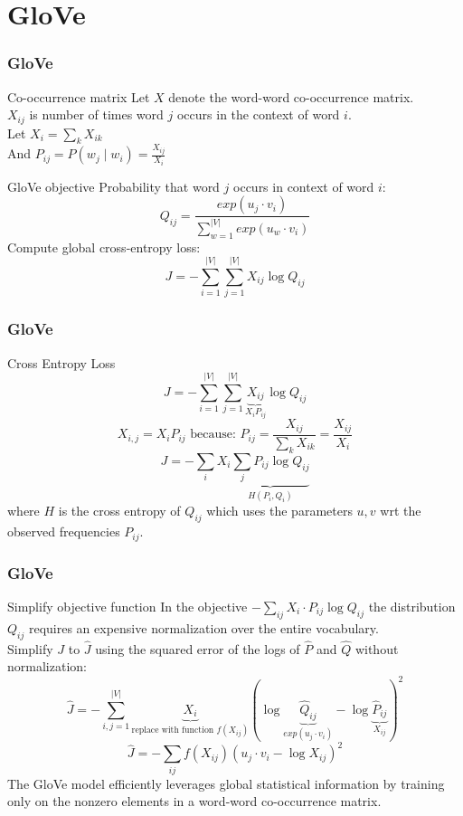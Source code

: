 \section{GloVe}
\frame{\tableofcontents[currentsection]}

\begin{frame}
\frametitle{GloVe}
\begin{alertblock}{Co-occurrence matrix}
Let $X$ denote the word-word co-occurrence matrix.\\
$X_{ij}$ is number of times word $j$ occurs in the context of word $i$.\\
Let $X_i = \sum_k X_{ik}$ \\
And $P_{ij} = P(w_j \mid w_i) = \frac{X_{ij}}{X_i}$	
\end{alertblock}
\pause
\begin{alertblock}{GloVe objective}
Probability that word $j$ occurs in context of word $i$:
\[ Q_{ij} = \frac{exp(u_j \cdot v_i)}{\sum_{w=1}^{|V|} exp(u_w \cdot v_i) } \]
Compute global cross-entropy loss:
\[ J = - \sum_{i=1}^{|V|} \sum_{j=1}^{|V|} X_{ij} \log Q_{ij} \]
\end{alertblock}
\end{frame}

\begin{frame}
\frametitle{GloVe}
\begin{alertblock}{Cross Entropy Loss}
\[ J = - \sum_{i=1}^{|V|} \sum_{j=1}^{|V|} \underbrace{X_{ij}}_{X_i P_{ij}} \log Q_{ij} \]
 \[ \textrm{$X_{i,j} = X_i P_{ij}$ because: } P_{ij} = \frac{X_{ij}}{\sum_{k} X_{ik}} = \frac{X_{ij}}{X_i} \]
\[ J = - \sum_i X_i \underbrace{\sum_j P_{ij} \log Q_{ij}}_{H(P_i, Q_i)} \]
where $H$ is the cross entropy of $Q_{ij}$ which uses the parameters $u, v$ wrt the observed frequencies $P_{ij}$.
\end{alertblock}
\end{frame}


\begin{frame}
\frametitle{GloVe}
\begin{alertblock}{Simplify objective function}
 In the objective $- \sum_{ij} X_i \cdot P_{ij} \log Q_{ij}$ the distribution $Q_{ij}$ requires an expensive normalization over the entire vocabulary.\\
Simplify $J$ to $\hat{J}$ using the squared error of the logs of $\hat{P}$ and $\hat{Q}$ without normalization:
\[ \hat{J} = - \sum_{i,j=1}^{|V|} \underbrace{X_i}_{\textrm{replace with function $f(X_{ij})$}} \left( \log \underbrace{\hat{Q}_{ij}}_{exp(u_j \cdot v_i)} - \log \underbrace{\hat{P}_{ij}}_{X_{ij}} \right)^2 \]
\[ \hat{J} = - \sum_{ij} f(X_{ij})  ( u_j \cdot v_i - \log X_{ij} )^2 \] 
The GloVe model efficiently leverages global statistical information by training only on the nonzero elements in a word-word co-occurrence matrix.
\end{alertblock}
\end{frame}

